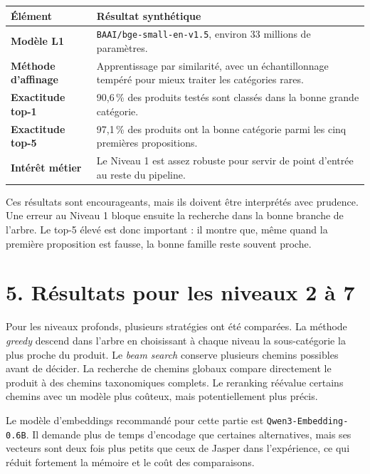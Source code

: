 \documentclass[11pt,a4paper]{article}
\begin{document}
\begin{center}
\begin{tabularx}{0.96\textwidth}{>{\bfseries}p{4.1cm}X}
\toprule
Élément & Résultat synthétique \\
\midrule
Modèle L1 & \texttt{BAAI/bge-small-en-v1.5}, environ 33 millions de paramètres. \\
Méthode d'affinage & Apprentissage par similarité, avec un échantillonnage tempéré pour mieux traiter les catégories rares. \\
Exactitude top-1 & 90{,}6\,\% des produits testés sont classés dans la bonne grande catégorie. \\
Exactitude top-5 & 97{,}1\,\% des produits ont la bonne catégorie parmi les cinq premières propositions. \\
Intérêt métier & Le Niveau 1 est assez robuste pour servir de point d'entrée au reste du pipeline. \\
\bottomrule
\end{tabularx}
\end{center}

Ces résultats sont encourageants, mais ils doivent être interprétés avec prudence. Une erreur au Niveau 1 bloque ensuite la recherche dans la bonne branche de l'arbre. Le top-5 élevé est donc important : il montre que, même quand la première proposition est fausse, la bonne famille reste souvent proche.

\section*{5. Résultats pour les niveaux 2 à 7}

Pour les niveaux profonds, plusieurs stratégies ont été comparées. La méthode \emph{greedy} descend dans l'arbre en choisissant à chaque niveau la sous-catégorie la plus proche du produit. Le \emph{beam search} conserve plusieurs chemins possibles avant de décider. La recherche de chemins globaux compare directement le produit à des chemins taxonomiques complets. Le reranking réévalue certains chemins avec un modèle plus coûteux, mais potentiellement plus précis.

Le modèle d'embeddings recommandé pour cette partie est \texttt{Qwen3-Embedding-0.6B}. Il demande plus de temps d'encodage que certaines alternatives, mais ses vecteurs sont deux fois plus petits que ceux de Jasper dans l'expérience, ce qui réduit fortement la mémoire et le coût des comparaisons.
\end{document}
